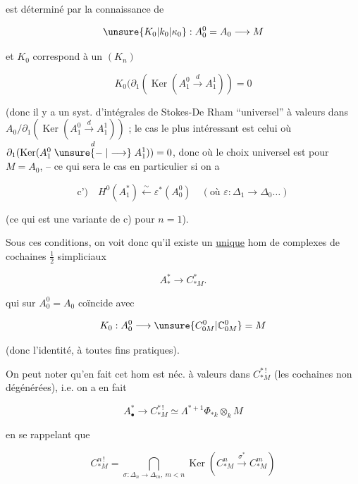 
est déterminé par la connaissance de

\[
\unsure{K_0|k_0|\kappa_0}:A^0_0=A_0\longrightarrow M
\]

et $K_0$ correspond à un $(K_n)$ 

\[
K_0(\partial_1(\operatorname{Ker}(A^0_1\xrightarrow{d}A^1_1))=0
\]

(donc il y a un syst. d'intégrales de Stokes-De Rham ``universel'' à valeurs dans $A_0/\partial_1(\operatorname{Ker}(A_1^0\xrightarrow{d}A_1^1))$ ; le cas le plus intéressant est celui où $\partial_1(\operatorname{Ker}(A_1^0\mathrel{\overset{d}{\unsure{\relbar|\longrightarrow}}}A_1^1))=0$, donc où le choix universel est pour $M=A_0$, -- ce qui sera le cas en particulier si on a

\[
\text{c')}\quad H^0(A^*_1)\xleftarrow{\sim}\varepsilon^*(A_0^0)\quad(\text{où }\varepsilon:\Delta_1\to\Delta_0\ldots)
\]


(ce qui est une variante de c) pour $n=1$).

Sous ces conditions, on voit donc qu'il existe un \uline{unique} hom de complexes de cochaines $\frac{1}{2}$ simpliciaux

\[
A^*_{*}\longrightarrow C^*_{*M}.
\]

qui sur $A_0^0=A_0$ coïncide avec

\[
K_0:A_0^0\longrightarrow \unsure{C^0_{0M}|\mathbb C^0_{0M}}=M
\]

(donc l'identité, à toutes fins pratiques).

On peut noter qu'en fait cet hom est néc. à valeurs dans $C^{*\,!}_{*M}$ (les cochaines non dégénérées), i.e. on a en fait

\[
A^*_\bullet\longrightarrow C^{*\,!}_{*M}\simeq\Lambda^{*+1}\Phi_{*k}\otimes_k M
\]

en se rappelant que

\[
C^{n\,!}_{*M}=\bigcap_{\sigma:\Delta_n\to\Delta_m,\ m<n}\operatorname{Ker}(C^n_{*M}\xrightarrow{\sigma^*} C^m_{*M})
\]

